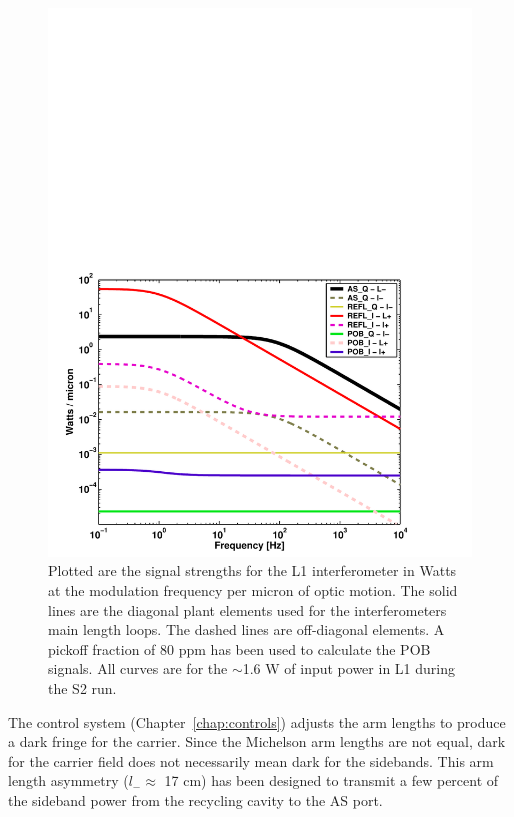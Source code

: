 \begin{figure}[!h]
\centerline{
\includegraphics[angle=0,width=6.0in]{Figures/Chap3/plant.pdf}}
\caption[LLO Optical Plant]{Plotted are the signal strengths for the L1 interferometer
                in Watts at the modulation frequency per micron of optic
                motion. The solid lines are the diagonal plant elements
                used for the interferometers main length loops. The dashed
                lines are off-diagonal elements. A pickoff fraction of
                80 ppm has been used to calculate the POB signals. All curves are
                for the $\sim$1.6 W of input power in L1 during the S2 run.}
\label{fig:Plant}
\end{figure}
The control system (Chapter~\ref{chap:controls}) adjusts the arm lengths to 
produce a dark fringe
for the carrier. Since the Michelson arm lengths are not equal, dark for the
carrier field does not necessarily mean dark for the sidebands. This arm
length asymmetry ($l_- \approx$ 17 cm) has been designed to transmit a few percent 
of the sideband power from the recycling cavity to the AS port.

